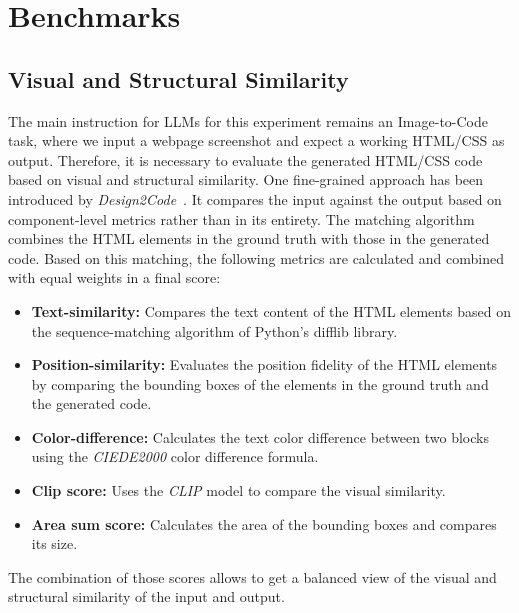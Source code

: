 \chapter{Benchmarks}\label{chapter:Benchmarks}

\section{Visual and Structural Similarity}
The main instruction for LLMs for this experiment remains an Image-to-Code task, where 
we input a webpage screenshot and expect a working HTML/CSS as output.
Therefore, it 
is necessary to evaluate the generated HTML/CSS code based on visual and structural
similarity. \newline
One fine-grained approach has been introduced by \textit{Design2Code}~\parencite{si2024design2code}.
It compares the input against the output based on component-level metrics rather than in its entirety.
The matching algorithm combines the 
HTML elements in the ground truth with those in the generated code. Based on this 
matching, the following metrics are calculated and combined with equal 
weights in a final score:
\begin{itemize}
  \item \textbf{Text-similarity:} Compares the text content of the HTML elements based on 
  the sequence-matching algorithm of Python's difflib library.
  \item \textbf{Position-similarity:} Evaluates the position fidelity of the HTML elements
  by comparing the bounding boxes of the elements in the ground truth and the generated code.
  \item \textbf{Color-difference:} Calculates the text color difference between two blocks 
  using the \textit{CIEDE2000} color difference formula.
  \item \textbf{Clip score:} Uses the \textit{CLIP} model to compare the visual similarity.
  \item \textbf{Area sum score:} Calculates the area of the bounding boxes and compares its
  size.
\end{itemize}
The combination of those scores allows to get a balanced view of the visual and 
structural similarity of the input and output.


